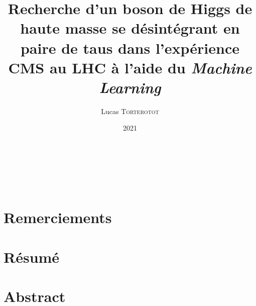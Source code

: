 \documentclass[11pt,a4paper,twoside]{book}
\institute[UCBL]{Université Claude Bernard Lyon 1} %
\title{Recherche d'un boson de Higgs de haute masse se désintégrant en paire de taus dans l'expérience CMS au LHC à l'aide du \emph{Machine Learning}}
\author[L. \textsc{Torterotot}]{Lucas \textsc{Torterotot}}
\date{\todo{XX xxxx} 2021}
\begin{document}
\def\ifref#1#2#3{#2}
\pagestyle{empty}

\cleardoublepage
~\vfill
\begin{flushright}
\end{flushright}
\vfill\vfill~
\cleardoublepage
\chapter*{Remerciements}\thispagestyle{empty}\pagestyle{empty}

\cleardoublepage
\chapter*{Résumé}\thispagestyle{empty}\pagestyle{empty}

\chapter*{Abstract}\thispagestyle{empty}\pagestyle{empty}

\cleardoublepage
\frontmatter
\tableofcontents
\listoffigures
\listoftables
\mainmatter



\appendix\def\minitoc{}

\backmatter
\printbibliography
\end{document}
